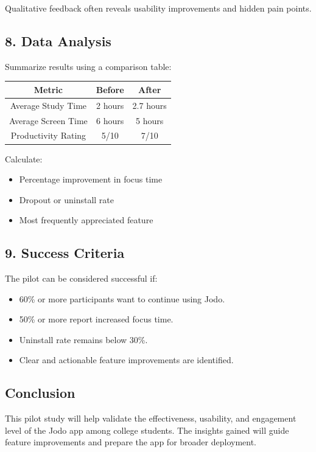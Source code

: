 \documentclass[12pt]{article}
\begin{document}
Qualitative feedback often reveals usability improvements and hidden pain points.

\subsection{8. Data Analysis}

Summarize results using a comparison table:

\begin{center}
\begin{tabular}{|c|c|c|}
\hline
Metric & Before & After \\
\hline
Average Study Time & 2 hours & 2.7 hours \\
Average Screen Time & 6 hours & 5 hours \\
Productivity Rating & 5/10 & 7/10 \\
\hline
\end{tabular}
\end{center}

Calculate:
\begin{itemize}
    \item Percentage improvement in focus time
    \item Dropout or uninstall rate
    \item Most frequently appreciated feature
\end{itemize}

\subsection{9. Success Criteria}

The pilot can be considered successful if:

\begin{itemize}
    \item 60\% or more participants want to continue using Jodo.
    \item 50\% or more report increased focus time.
    \item Uninstall rate remains below 30\%.
    \item Clear and actionable feature improvements are identified.
\end{itemize}

\subsection{Conclusion}

This pilot study will help validate the effectiveness, usability, and engagement level of the Jodo app among college students. The insights gained will guide feature improvements and prepare the app for broader deployment.
\end{document}
